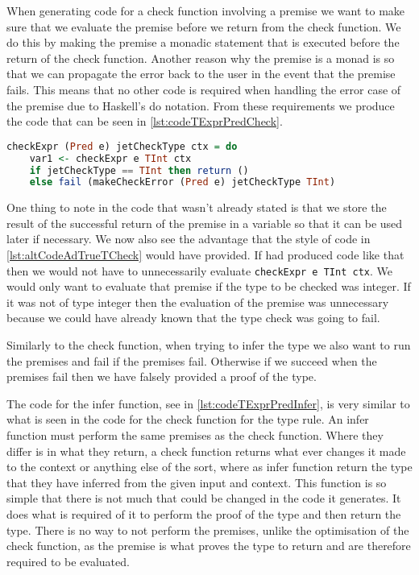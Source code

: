 When generating code for a check function involving a premise we want to make sure that we evaluate the premise before we return from the check function.
We do this by making the premise a monadic statement that is executed before the return of the check function.
Another reason why the premise is a monad is so that we can propagate the error back to the user in the event that the premise fails.
This means that no other code is required when handling the error case of the premise due to Haskell's do notation.
From these requirements we produce the code that can be seen in \autoref{lst:codeTExprPredCheck}.

\begin{lstlisting}[caption = Code generated for checkExpr from TExprPred, label=lst:codeTExprPredCheck, language=Haskell]
checkExpr (Pred e) jetCheckType ctx = do
    var1 <- checkExpr e TInt ctx
    if jetCheckType == TInt then return () 
    else fail (makeCheckError (Pred e) jetCheckType TInt)
\end{lstlisting}

One thing to note in the code that wasn't already stated is that we store the result of the successful return of the premise in a variable so that it can be used later if necessary.
We now also see the advantage that the style of code in \autoref{lst:altCodeAdTrueTCheck} would have provided.
If had produced code like that then we would not have to unnecessarily evaluate \texttt{checkExpr e TInt ctx}.
We would only want to evaluate that premise if the type to be checked was integer.
If it was not of type integer then the evaluation of the premise was unnecessary because we could have already known that the type check was going to fail.

Similarly to the check function, when trying to infer the type we also want to run the premises and fail if the premises fail.
Otherwise if we succeed when the premises fail then we have falsely provided a proof of the type.

The code for the infer function, see in \autoref{lst:codeTExprPredInfer}, is very similar to what is seen in the code for the check function for the type rule.
An infer function must perform the same premises as the check function.
Where they differ is in what they return, a check function returns what ever changes it made to the context or anything else of the sort, where as infer function return the type that they have inferred from the given input and context.
This function is so simple that there is not much that could be changed in the code it generates.
It does what is required of it to perform the proof of the type and then return the type.
There is no way to not perform the premises, unlike the optimisation of the check function, as the premise is what proves the type to return and are therefore required to be evaluated.

